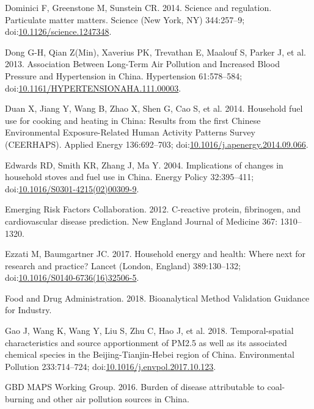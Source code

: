 \documentclass[
  letterpaper,
  DIV=11,
  numbers=noendperiod]{scrartcl}
\newlength{\cslhangindent}
\newenvironment{CSLReferences}[2] %
 {\begin{list}{}{%
  \setlength{\itemindent}{0pt}
  \setlength{\leftmargin}{0pt}
  \setlength{\parsep}{0pt}
  \ifodd #1
   \setlength{\leftmargin}{\cslhangindent}
   \setlength{\itemindent}{-1\cslhangindent}
  \fi
  \setlength{\itemsep}{#2\baselineskip}}}
 {\end{list}}
\begin{document}
\begin{CSLReferences}{1}{1}
Dominici F, Greenstone M, Sunstein CR. 2014. Science and regulation.
{Particulate} matter matters. Science (New York, NY) 344:257--9;
doi:\href{https://doi.org/10.1126/science.1247348}{10.1126/science.1247348}.

Dong G-H, Qian Z(Min), Xaverius PK, Trevathan E, Maalouf S, Parker J, et
al. 2013. Association {Between Long-Term Air Pollution} and {Increased
Blood Pressure} and {Hypertension} in {China}. Hypertension 61:578--584;
doi:\href{https://doi.org/10.1161/HYPERTENSIONAHA.111.00003}{10.1161/HYPERTENSIONAHA.111.00003}.

Duan X, Jiang Y, Wang B, Zhao X, Shen G, Cao S, et al. 2014. Household
fuel use for cooking and heating in {China}: {Results} from the first
{Chinese Environmental Exposure-Related Human Activity Patterns Survey}
({CEERHAPS}). Applied Energy 136:692--703;
doi:\href{https://doi.org/10.1016/j.apenergy.2014.09.066}{10.1016/j.apenergy.2014.09.066}.

Edwards RD, Smith KR, Zhang J, Ma Y. 2004. Implications of changes in
household stoves and fuel use in {China}. Energy Policy 32:395--411;
doi:\href{https://doi.org/10.1016/S0301-4215(02)00309-9}{10.1016/S0301-4215(02)00309-9}.

Emerging Risk Factors Collaboration. 2012. C-reactive protein,
fibrinogen, and cardiovascular disease prediction. New England Journal
of Medicine 367: 1310--1320.

Ezzati M, Baumgartner JC. 2017. Household energy and health: Where next
for research and practice? Lancet (London, England) 389:130--132;
doi:\href{https://doi.org/10.1016/S0140-6736(16)32506-5}{10.1016/S0140-6736(16)32506-5}.

Food and Drug Administration. 2018. Bioanalytical {Method Validation
Guidance} for {Industry}.

Gao J, Wang K, Wang Y, Liu S, Zhu C, Hao J, et al. 2018.
Temporal-spatial characteristics and source apportionment of {PM2}.5 as
well as its associated chemical species in the {Beijing-Tianjin-Hebei}
region of {China}. Environmental Pollution 233:714--724;
doi:\href{https://doi.org/10.1016/j.envpol.2017.10.123}{10.1016/j.envpol.2017.10.123}.

GBD MAPS Working Group. 2016. Burden of disease attributable to
coal-burning and other air pollution sources in {China}.


\end{CSLReferences}
\end{document}
